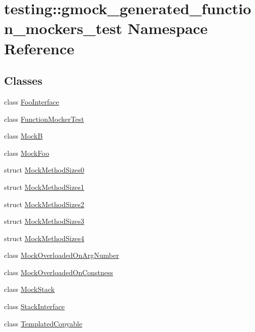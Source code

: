 \hypertarget{namespacetesting_1_1gmock__generated__function__mockers__test}{}\section{testing\+::gmock\+\_\+generated\+\_\+function\+\_\+mockers\+\_\+test Namespace Reference}
\label{namespacetesting_1_1gmock__generated__function__mockers__test}
\subsection*{Classes}
\begin{DoxyCompactItemize}
\item 
class \mbox{\hyperlink{classtesting_1_1gmock__generated__function__mockers__test_1_1_foo_interface}{Foo\+Interface}}
\item 
class \mbox{\hyperlink{classtesting_1_1gmock__generated__function__mockers__test_1_1_function_mocker_test}{Function\+Mocker\+Test}}
\item 
class \mbox{\hyperlink{classtesting_1_1gmock__generated__function__mockers__test_1_1_mock_b}{MockB}}
\item 
class \mbox{\hyperlink{classtesting_1_1gmock__generated__function__mockers__test_1_1_mock_foo}{Mock\+Foo}}
\item 
struct \mbox{\hyperlink{structtesting_1_1gmock__generated__function__mockers__test_1_1_mock_method_sizes0}{Mock\+Method\+Sizes0}}
\item 
struct \mbox{\hyperlink{structtesting_1_1gmock__generated__function__mockers__test_1_1_mock_method_sizes1}{Mock\+Method\+Sizes1}}
\item 
struct \mbox{\hyperlink{structtesting_1_1gmock__generated__function__mockers__test_1_1_mock_method_sizes2}{Mock\+Method\+Sizes2}}
\item 
struct \mbox{\hyperlink{structtesting_1_1gmock__generated__function__mockers__test_1_1_mock_method_sizes3}{Mock\+Method\+Sizes3}}
\item 
struct \mbox{\hyperlink{structtesting_1_1gmock__generated__function__mockers__test_1_1_mock_method_sizes4}{Mock\+Method\+Sizes4}}
\item 
class \mbox{\hyperlink{classtesting_1_1gmock__generated__function__mockers__test_1_1_mock_overloaded_on_arg_number}{Mock\+Overloaded\+On\+Arg\+Number}}
\item 
class \mbox{\hyperlink{classtesting_1_1gmock__generated__function__mockers__test_1_1_mock_overloaded_on_constness}{Mock\+Overloaded\+On\+Constness}}
\item 
class \mbox{\hyperlink{classtesting_1_1gmock__generated__function__mockers__test_1_1_mock_stack}{Mock\+Stack}}
\item 
class \mbox{\hyperlink{classtesting_1_1gmock__generated__function__mockers__test_1_1_stack_interface}{Stack\+Interface}}
\item 
class \mbox{\hyperlink{classtesting_1_1gmock__generated__function__mockers__test_1_1_templated_copyable}{Templated\+Copyable}}
\end{DoxyCompactItemize}
